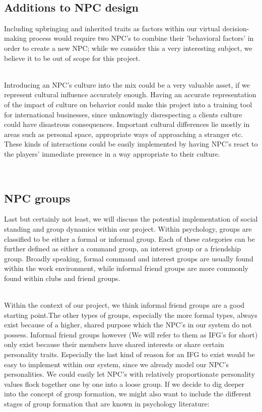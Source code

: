 \documentclass[11pt]{article} %
\begin{document}
~\\
\subsection{Additions to NPC design}
Including upbringing and inherited traits as factors within our virtual decision-making process would require two NPC's to combine their 'behavioral factors' in order to create a new NPC; while we consider this a very interesting subject, we believe it to be out of scope for this project. 

~\\
Introducing an NPC's culture into the mix could be a very valuable asset, if we represent cultural influence accurately enough. Having an accurate representation of the impact of culture on behavior could make this project into a training tool for international businesses, since unknowingly disrespecting a clients culture could have disastrous consequences. Important cultural differences lie mostly in areas such as personal space, appropriate ways of approaching a stranger etc. These kinds of interactions could be easily implemented by having NPC's react to the players' immediate presence in a way appropriate to their culture.

~\\
\subsection{NPC groups}
Last but certainly not least, we will discuss the potential implementation of social standing and group dynamics within our project. Within psychology, groups are classified to be either a formal or informal group. Each of these categories can be further defined as either a command group, an interest group or a friendship group. Broadly speaking, formal command and interest groups are usually found within the work environment, while informal friend groups are more commonly found within clubs and friend groups. 

~\\
Within the context of our project, we think informal friend groups are a good starting point.The other types of groups, especially the more formal types, always exist because of a higher, shared purpose which the NPC's in our system do not possess. Informal friend groups however  (We will refer to them as IFG's for short) only exist because their members have shared interests or share certain personality traits. Especially the last kind of reason for an IFG to exist would be easy to implement within our system, since we already model our NPC's personalities. We could easily let NPC's with relatively proportionate personality values flock together one by one into a loose group. If we decide to dig deeper into the concept of group formation, we might also want to include the different stages of group formation that are known in psychology literature: %
\end{document}
